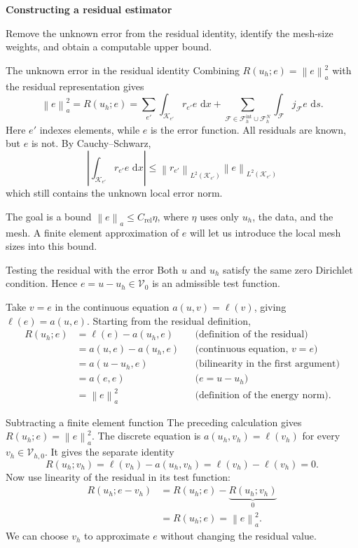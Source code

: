 \documentclass[11pt,aspectratio=169]{beamer}
\newcommand{\dd}{\,\mathrm{d}}
\newcommand{\Fh}{\mathcal F_h}
\newcommand{\Vzero}{\mathcal V_0}
\newcommand{\Vhzero}{\mathcal V_{h,0}}
\newcommand{\norm}[2][]{\left\lVert#2\right\rVert_{#1}}
\begin{document}
\begin{frame}[plain]
  \centering\vfill
  {\LARGE\bfseries Constructing a residual estimator\par}
  \vspace{0.4cm}
  {\large Remove the unknown error from the residual identity, identify the
  mesh-size weights, and obtain a computable upper bound.\par}
  \vfill
\end{frame}

\begin{frame}{The unknown error in the residual identity}
Combining $R(u_h;e)=\norm[a]{e}^2$ with the residual representation gives
\[
  \norm[a]{e}^2
  =R(u_h;e)
  =\sum_{e'}\int_{\mathcal K_{e'}}r_{e'} e\,\dd x
  +\sum_{\mathcal F\in\Fh^{\mathrm{int}}\cup\Fh^N}
   \int_{\mathcal F}j_{\mathcal F}e\,\dd s.
\]
Here $e'$ indexes elements, while $e$ is the error function. All residuals
are known, but $e$ is not. By Cauchy--Schwarz,
\[
  \left|\int_{\mathcal K_{e'}}r_{e'} e\,\dd x\right|
  \leq \norm[L^2(\mathcal K_{e'})]{r_{e'}}
        \norm[L^2(\mathcal K_{e'})]{e}
\]
which still contains the unknown local error norm.

The goal is a bound $\norm[a]{e}\leq C_{\mathrm{rel}}\eta$, where $\eta$
uses only $u_h$, the data, and the mesh. A finite element approximation of
$e$ will let us introduce the local mesh sizes into this bound.
\end{frame}

\begin{frame}{Testing the residual with the error}
Both $u$ and $u_h$ satisfy the same zero Dirichlet condition. Hence
$e=u-u_h\in\Vzero$ is an admissible test function.

Take $v=e$ in the continuous equation $a(u,v)=\ell(v)$, giving
$\ell(e)=a(u,e)$. Starting from the residual definition,
\[
\begin{aligned}
 R(u_h;e)&=\ell(e)-a(u_h,e)
   &&\text{(definition of the residual)}\\[3pt]
 &=a(u,e)-a(u_h,e)
   &&\text{(continuous equation, $v=e$)}\\[3pt]
 &=a(u-u_h,e)
   &&\text{(bilinearity in the first argument)}\\[3pt]
 &=a(e,e)
   &&\text{($e=u-u_h$)}\\[3pt]
 &=\norm[a]{e}^2
   &&\text{(definition of the energy norm)}.
\end{aligned}
\]
\end{frame}

\begin{frame}{Subtracting a finite element function}
The preceding calculation gives $R(u_h;e)=\norm[a]{e}^2$.
The discrete equation is $a(u_h,v_h)=\ell(v_h)$ for every
$v_h\in\Vhzero$. It gives the separate identity
\[
 R(u_h;v_h)=\ell(v_h)-a(u_h,v_h)=\ell(v_h)-\ell(v_h)=0.
\]
Now use linearity of the residual in its test function:
\[
\begin{aligned}
 R(u_h;e-v_h)
 &=R(u_h;e)-\underbrace{R(u_h;v_h)}_{0}\\
 &=R(u_h;e)=\norm[a]{e}^2.
\end{aligned}
\]
We can choose $v_h$ to approximate $e$ without changing the residual value.
\end{frame}
\end{document}
